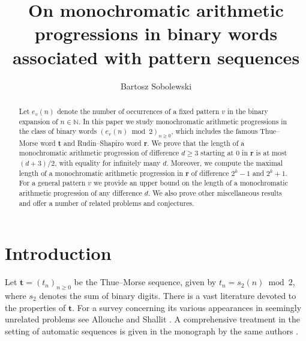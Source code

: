 \documentclass[a4paper,11pt]{amsart}
\theoremstyle{definition}
\newcommand{\N}{\mathbb{N}}
\begin{document}
\title[On monochromatic arithmetic progressions in binary words]{On monochromatic arithmetic progressions in binary words associated with pattern sequences}

\author{Bartosz Sobolewski}
\address{Institute of Mathematics, Faculty of Mathematics and Computer Science, Jagiellonian University in Krak\'{o}w, \\
 \L{}ojasiewicza 6, 30-348, Krak\'{o}w, Poland}

\begin{abstract}
Let $e_v(n)$ denote the number of occurrences of a fixed pattern $v$ in the binary expansion of $n \in \N$. In this paper we study monochromatic arithmetic progressions in the class of binary words $(e_v(n) \bmod{2})_{n \geq 0}$, which includes the famous Thue--Morse word $\mathbf{t}$ and Rudin--Shapiro word $\mathbf{r}$. We prove that the length of a monochromatic arithmetic progression of difference $d \geq 3$ starting at $0$ in $\mathbf{r}$ is at most $(d+3)/2$, with equality for infinitely many $d$. Moreover, we compute the maximal length of a monochromatic arithmetic progression in $\mathbf{r}$ of difference $2^k-1$ and $2^k+1$. For a general pattern $v$ we provide an upper bound on the length of a monochromatic arithmetic progression of any difference $d$. We also prove other miscellaneous results and offer a number of related problems and conjectures.
\end{abstract}

\maketitle

\section{Introduction} \label{sec:introduction}

Let $\mathbf{t} = (t_n)_{n \geq 0}$ be the Thue--Morse sequence, given by $t_n = s_2(n) \bmod{2}$, where $s_2$ denotes the sum of binary digits. There is a vast literature devoted to the properties of $\mathbf{t}$. For a survey concerning its various appearances in seemingly unrelated problems see Allouche and Shallit \cite{AS99}. A comprehensive treatment in the setting of automatic sequences is given in the monograph by the same authors \cite{AS03}.
\end{document}
